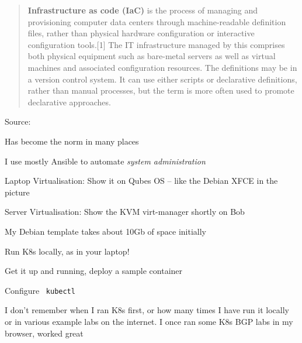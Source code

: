 \documentclass[Screen16to9,17pt]{foils}
\begin{document}


\begin{quote}
{\bf Infrastructure as code (IaC)} is the process of managing and provisioning computer data centers through machine-readable definition files, rather than physical hardware configuration or interactive configuration tools.[1] The IT infrastructure managed by this comprises both physical equipment such as bare-metal servers as well as virtual machines and associated configuration resources. The definitions may be in a version control system. It can use either scripts or declarative definitions, rather than manual processes, but the term is more often used to promote declarative approaches.
\end{quote}
Source: {\footnotesize
{}}

\begin{list2}
\item Has become the norm in many places
\item I use mostly Ansible to automate \emph{system administration}
\end{list2}






\begin{list2}
\item Laptop Virtualisation: Show it on Qubes OS -- like the Debian XFCE in the picture
\item Server Virtualisation: Show the KVM virt-manager shortly on Bob
\item My Debian template takes about 10Gb of space initially
\end{list2}


\begin{list2}
\item Run K8s locally, as in your laptop!
\item Get it up and running, deploy a sample container
\item Configure \faWrench\ \verb+kubectl+
\end{list2}

I don't remember when I ran K8s first, or how many times I have run it locally or in various example labs on the internet. I once ran some K8s BGP labs in my browser, worked great
\end{document}
